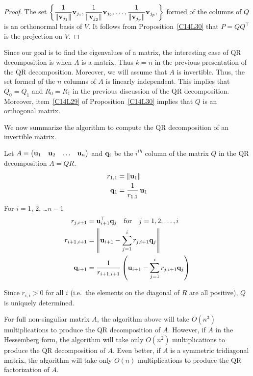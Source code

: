 \begin{proof}
The set $\displaystyle \left\{ \frac{1}{\|\mathbf{v}_{j_1}\|}\mathbf{v}_{j_1} ,
\frac{1}{\|\mathbf{v}_{j_2}\|}\mathbf{v}_{j_2} , \ldots ,
\frac{1}{\|\mathbf{v}_{j_p}\|}\mathbf{v}_{j_p} ,\right\}$ formed of the columns
of $Q$ is an orthonormal basis of $V$.
It follows from Proposition~\ref{C14L30} that $P = QQ^\top$ is
the projection on $V$.
\end{proof}

Since our goal is to find the eigenvalues of a matrix, the interesting
case of QR decomposition is when $A$ is a \nn matrix.  Thus $k=n$ in
the previous presentation of the QR decomposition.  Moreover, we
will assume that $A$ is invertible.  Thus, the set formed of the $n$
columns of $A$ is linearly independent.   This implies that
$Q_0 = Q_1$ and $R_0 = R_1$ in the previous discussion of the QR
decomposition.  Moreover, item~\ref{C14L29} of
Proposition~\ref{C14L30} implies that $Q$ is an orthogonal
matrix.

We now summarize the algorithm to compute the QR decomposition of an
\nn invertible matrix.

\begin{algo}
Let
$A = \begin{pmatrix} \mathbf{u}_1 & \mathbf{u}_2 & \ldots & \mathbf{u}_n\end{pmatrix}$
and $\mathbf{q}_i$ be the $i^{th}$ column of the matrix $Q$ in the QR
decomposition $A = QR$.
\begin{align*}
r_{1,1} &= \|\mathbf{u}_1\| \\
\mathbf{q}_1 &= \frac{1}{r_{1,1}}\, \mathbf{u}_1
\end{align*}
For $i=1$, $2$, \ldots $n-1$
\begin{align*}
r_{j,i+1} &= \mathbf{u}_{i+1}^\top \mathbf{q}_j \quad \text{for} \quad
j=1,2,\ldots,i \\
r_{i+1,i+1} &= \left\| \mathbf{u}_{i+1} - \sum_{j=1}^i r_{j,i+1}\mathbf{q}_j
\right\| \\
\mathbf{q}_{i+1} &= \frac{1}{r_{i+1.i+1}} \left(
\mathbf{u}_{i+1} - \sum_{j=1}^i r_{j,i+1}\mathbf{q}_j \right)
\end{align*}
\end{algo}

Since $r_{i,i}>0$ for all $i$ (i.e.\ the elements on the diagonal of
$R$ are all positive), $Q$ is uniquely determined.

\begin{rmk}
For full non-singuliar matrix $A$, the algorithm above will take
$O(n^3)$ multiplications to produce the QR decomposition of $A$.
However, if $A$ in the Hessemberg form, the algorithm will take only
$O(n^2)$ multiplications to produce the QR decomposition of $A$.  Even
better, if $A$ is a symmetric tridiagonal matrix, the algorithm will
take only $O(n)$ multiplications to produce the QR factorization of
$A$.
\label{C14L32}
\end{rmk}


